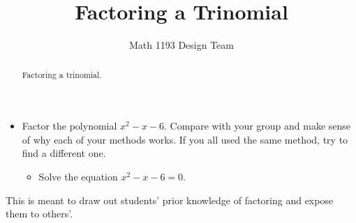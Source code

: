 \documentclass[noauthor]{ximera}
\title{Factoring a Trinomial}
\author{Math 1193 Design Team}
\begin{document}
\begin{abstract}
    Factoring a trinomial.
\end{abstract}
\maketitle

\begin{itemize}
    \item Factor the polynomial \(x^2 - x - 6\). Compare with 
your group and make sense of why each of your methods
works. If you all used the same method, try to find
a different one.
    \begin{itemize}
        \item Solve the equation \(x^2 - x - 6 = 0\).
    \end{itemize}
\end{itemize}

\begin{instructorNotes}
This is meant to draw out students' prior knowledge of factoring and expose them to others'.
\end{instructorNotes}
\end{document}
